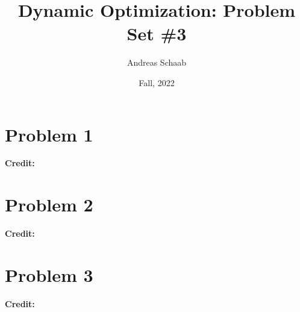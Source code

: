 \documentclass[11pt]{extarticle}
\title{Dynamic Optimization: Problem Set \#3}
\author{Andreas Schaab}
\date{Fall, 2022}
\theoremstyle{plain}
\theoremstyle{definition}
\begin{document}
\maketitle
\thispagestyle{empty}
\setcounter{page}{0}


\vspace{10mm}
\section*{Problem 1}

\textbf{Credit:} 



\vspace{10mm}
\section*{Problem 2}

\textbf{Credit:} 




\vspace{10mm}
\section*{Problem 3}

\textbf{Credit:} 
\end{document}
